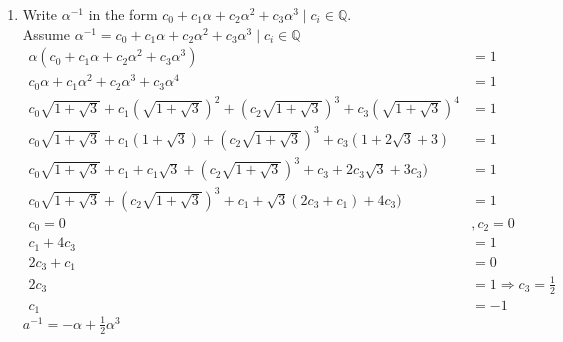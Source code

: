 \documentclass[12pt]{article}
\begin{document}
\begin{enumerate}
\begin{enumerate}
			\item Write $\alpha^{-1}$ in the form $c_0 + c_1\alpha + c_2\alpha^2 +
				c_3\alpha^3 \mid c_i \in \mathbb{Q}$.\\
				Assume $\alpha^{-1} = c_0 + c_1\alpha + c_2\alpha^2 + c_3\alpha^3 \mid
				c_i \in \mathbb{Q}$
				\begin{align*}
					\alpha(c_0 + c_1\alpha + c_2\alpha^2 + c_3\alpha^3) &= 1\\
					c_0\alpha + c_1\alpha^2 + c_2\alpha^3 + c_3\alpha^4 &= 1\\
					c_0\sqrt{1+\sqrt{3}} + c_1\left(\sqrt{1+\sqrt{3}}\right)^2 +
						\left(c_2\sqrt{1+\sqrt{3}}\right)^3 +
						c_3\left(\sqrt{1+\sqrt{3}}\right)^4 &= 1\\
					c_0\sqrt{1+\sqrt{3}} + c_1(1+\sqrt{3}) +
						\left(c_2\sqrt{1+\sqrt{3}}\right)^3 + c_3(1+2\sqrt{3}+3) &= 1\\
					c_0\sqrt{1+\sqrt{3}} + c_1 + c_1\sqrt{3} +
						\left(c_2\sqrt{1+\sqrt{3}}\right)^3 + c_3+2c_3\sqrt{3}+3c_3) &= 1\\
					c_0\sqrt{1+\sqrt{3}} + \left(c_2\sqrt{1+\sqrt{3}}\right)^3 + c_1 
						+\sqrt{3}(2c_3 + c_1) + 4c_3) &= 1\\
					c_0=0 &, c_2=0\\
					c_1 + 4c_3 &= 1\\
					2c_3+c_1 &= 0\\
					2c_3 &= 1 \Rightarrow c_3 = \frac{1}{2}\\
					c_1 &= -1
				\end{align*}
				$a^{-1} = -\alpha + \frac{1}{2}\alpha^3$
		\end{enumerate}

\end{enumerate}
\end{document}
